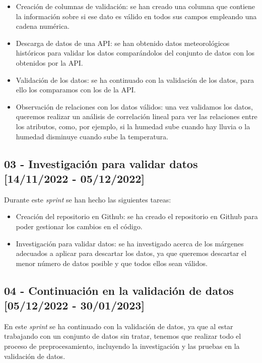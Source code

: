 \begin{itemize}
    \item Creación de columnas de validación: se han creado una columna que contiene la información sobre si ese dato es válido en todos sus campos empleando una cadena numérica.
    \item Descarga de datos de una API: se han obtenido datos meteorológicos históricos para validar los datos comparándolos del conjunto de datos con los obtenidos por la API.
    \item Validación de los datos: se ha continuado con la validación de los datos, para ello los comparamos con los de la API.
    \item Observación de relaciones con los datos válidos: una vez validamos los datos, queremos realizar un análisis de correlación lineal para ver las relaciones entre los atributos, como, por ejemplo, si la humedad sube cuando hay lluvia o la humedad disminuye cuando sube la temperatura.
\end{itemize}

\subsection{03 - Investigación para validar datos [14/11/2022 - 05/12/2022]}

Durante este \textit{sprint} se han hecho las siguientes tareas:

\begin{itemize}
    \item Creación del repositorio en Github: se ha creado el repositorio en Github para poder gestionar los cambios en el código.
    \item Investigación para validar datos: se ha investigado acerca de los márgenes adecuados a aplicar para descartar los datos, ya que queremos descartar el menor número de datos posible y que todos ellos sean válidos.
\end{itemize}

\subsection{04 - Continuación en la validación de datos [05/12/2022 - 30/01/2023]}

En este \textit{sprint} se ha continuado con la validación de datos, ya que al estar trabajando con un conjunto de datos sin tratar, tenemos que realizar todo el proceso de preprocesamiento, incluyendo la investigación y las pruebas en la validación de datos.

